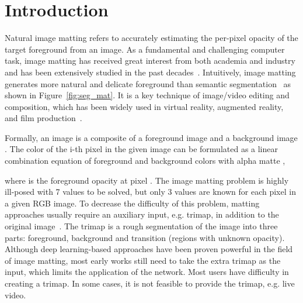 \documentclass[10pt,twocolumn,letterpaper]{article}
\begin{document}
\section{Introduction}
\label{sec:intro}
Natural image matting refers to accurately estimating the per-pixel opacity of the target foreground from an image. As a fundamental and challenging computer task, image matting has received great interest
from both academia and industry and has been extensively studied
in the past decades~\cite{aksoy2018semantic,aksoy2017designing,bai2007geodesic,chen2013knn,chuang2001bayesian,feng2016cluster,gastal2010shared,grady2005random,he2011global,levin2007closed,levin2008spectral,ruzon2000alpha}. Intuitively, image matting generates more natural and delicate foreground than semantic segmentation~\cite{chu2022pp, liu2021paddleseg} as shown in Figure~\ref{fig:seg_mat}. It is a key technique of image/video editing and composition, which has been widely used in virtual reality, augmented reality, and film production~\cite{boda2018survey}. 

Formally, an image  is a composite of a foreground image  and a background image . The color of the i-th pixel in the given image can be formulated as a linear combination equation of foreground and background colors with alpha matte ,

where  is the foreground opacity at pixel . The image matting problem is highly ill-posed with 7 values to be solved, but only 3 values are known for each pixel in a given RGB image. To decrease
the difficulty of this problem, matting approaches usually require an auxiliary input, e.g. trimap, in addition to the original image~\cite{bai2007geodesic,chen2013knn,chuang2001bayesian,gastal2010shared,grady2005random,he2011global,levin2007closed}. The trimap is a rough segmentation of the image into three parts: foreground, background and transition (regions with unknown opacity). Although deep learning-based approaches have been proven powerful in the field of image matting, most early works still need to take the extra trimap as the input, which limits the application of the network. Most users have difficulty in creating a trimap. In some cases, it is not feasible to provide the trimap, e.g. live video.
\end{document}
